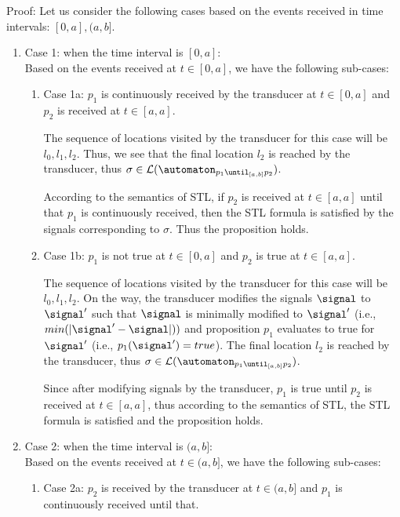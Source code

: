     Proof: Let us consider the following cases based on the events received in time intervals: $[0, a], (a,b]$.
    \begin{enumerate}
        \item Case 1: when the time interval is $[0,a]$:\\
        Based on the events received at $t\in [0,a]$, we have the following sub-cases:
        \begin{enumerate}
            \item Case 1a: $p_1$ is continuously received by the transducer at $t \in [0,a]$ and $p_2$ is received at $t\in[a,a]$.

            The sequence of locations visited by the transducer for this case will be $l_0, l_1, l_2$. Thus, we see that the final location $l_2$ is reached by the transducer, thus $\sigma \in \mathcal{L}(\automaton_{p_1\until_{[a,b]}p_2})$.

            According to the semantics of STL, if $p_2$ is received at $t\in[a, a]$ until that $p_1$ is continuously received, then the STL formula is satisfied by the signals corresponding to $\sigma$. Thus the proposition holds.
            
            \item Case 1b: $p_1$ is not true at $t \in [0,a]$ and $p_2$ is true at $t\in[a,a]$.

            The sequence of locations visited by the transducer for this case will be $l_0, l_1, l_2$. On the way, the transducer modifies the signals $\signal$ to $\signal'$  such that $\signal$ is minimally modified to $\signal'$ (i.e., $min(|\signal'-\signal|))$ and  proposition $p_1$ evaluates to true for $\signal'$ (i.e., $p_1(\signal')=true$). The final location $l_2$ is reached by the transducer, thus $\sigma \in \mathcal{L}(\automaton_{p_1\until_{[a,b]}p_2})$.

            Since after modifying signals by the transducer, $p_1$ is true until $p_2$ is received at $t\in[a, a]$, thus according to the semantics of STL, the STL formula is satisfied and the proposition holds.\\
            
        \end{enumerate}
        \item Case 2: when the time interval is $(a,b]$:\\
         Based on the events received at $t\in (a,b]$, we have the following sub-cases:
        \begin{enumerate}
            \item Case 2a: $p_2$ is received by the transducer at $t \in (a,b]$ and $p_1$ is continuously received until that.
            

\end{enumerate}
\end{enumerate}
